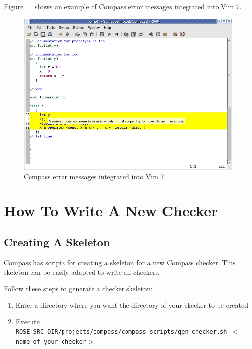 Figure ~\ref{Compass_VIM7_Screenshot} shows an example of Compass error
messages integrated into Vim 7.
\begin{figure}[!htp]
\hspace{-0.7in}
\includegraphics[width=7in]{compass_vim7.jpg}
\caption{Compass error messages integrated into Vim 7}
\label{Compass_VIM7_Screenshot}
\end{figure}

\clearpage
\section{How To Write A New Checker}

\subsection{Creating A Skeleton}

Compass has scripts for creating a skeleton for a new Compass
checker. This skeleton can be easily adapted to write all checkers.

Follow these steps to generate a checker skeleton:
\begin{enumerate}
   \item Enter a directory where you want the directory of your checker to be created
   \item Execute {\tt ROSE\_SRC\_DIR/projects/compass/compass\_scripts/gen\_checker.sh $<$name of your checker$>$}
\end{enumerate}

